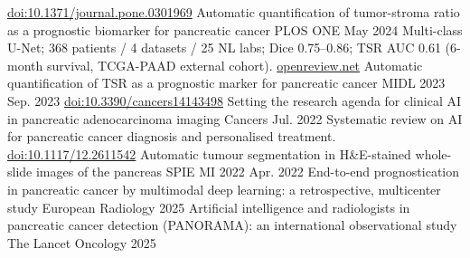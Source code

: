 


\begin{cventries}
    \cventry
        {\href{https://journals.plos.org/plosone/article?id=10.1371/journal.pone.0301969}{doi:10.1371/journal.pone.0301969}}
        {Automatic quantification of tumor-stroma ratio as a prognostic biomarker for pancreatic cancer}
        {PLOS ONE}
        {May 2024}
        {Multi-class U-Net; 368 patients / 4 datasets / 25 NL labs; Dice 0.75--0.86; TSR AUC 0.61 (6-month survival, TCGA-PAAD external cohort).}
    \vspace{1mm}
    \cventry
        {\href{https://openreview.net/pdf?id=Dtz_iaUpGc}{openreview.net}}
        {Automatic quantification of TSR as a prognostic marker for pancreatic cancer}
        {MIDL 2023}
        {Sep. 2023}
        {}
    \vspace{1mm}
    \cventry
        {\href{https://www.mdpi.com/2072-6694/14/14/3498}{doi:10.3390/cancers14143498}}
        {Setting the research agenda for clinical AI in pancreatic adenocarcinoma imaging}
        {Cancers}
        {Jul. 2022}
        {Systematic review on AI for pancreatic cancer diagnosis and personalised treatment.}
    \vspace{1mm}
    \cventry
        {\href{https://www.spiedigitallibrary.org/conference-proceedings-of-spie/12039/120391F/Automatic-tumour-segmentation-in-HE-stained-whole-slide-images-of/10.1117/12.2611542.short}{doi:10.1117/12.2611542}}
        {Automatic tumour segmentation in H\&E-stained whole-slide images of the pancreas}
        {SPIE MI 2022}
        {Apr. 2022}
        {}
    \vspace{1mm}
    \cventry
        {}
        {End-to-end prognostication in pancreatic cancer by multimodal deep learning: a retrospective, multicenter study}
        {European Radiology}
        {2025}
        {}
    \vspace{1mm}
    \cventry
        {}
        {Artificial intelligence and radiologists in pancreatic cancer detection (PANORAMA): an international observational study}
        {The Lancet Oncology}
        {2025}
        {}
    \vspace{1mm}

\end{cventries}
